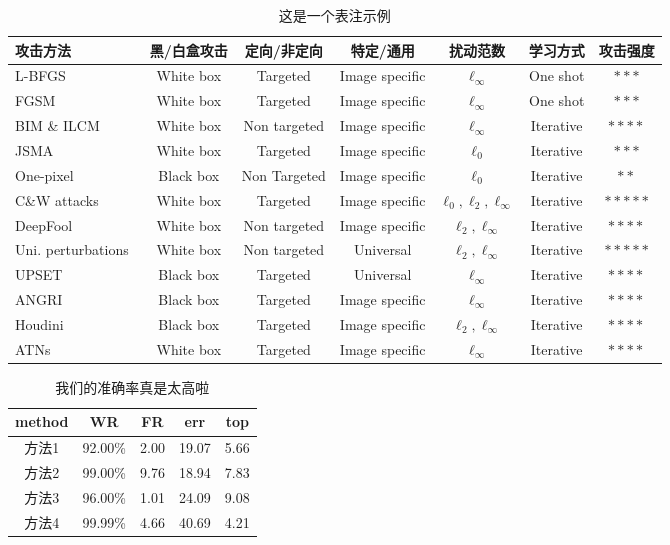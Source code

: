 \documentclass[zihao=-4]{ctexart}
\begin{document}
\begin{spacing}{1.5}
\begin{table}[t]
\centering
\caption{这是一个表注示例}
\begin{tabular}{|l||c|c|c|c|c|c|}
\hline
 {\textbf{攻击方法}}							&  黑/白盒攻击	&  定向/非定向 	& 特定/通用 	& 扰动范数 & 学习方式 		& 攻击强度  \\ \hline\hline
L-BFGS~ 		&  White box		&  Targeted					& Image specific			& $\ell_{\infty}$ 	& One shot		& $***$	\\ \hline
FGSM~		&  White box		&  Targeted					& Image specific			& $\ell_{\infty}$	& One shot		& $***$ \\ \hline
BIM \& ILCM~&  White box		& Non targeted				& Image specific			& $\ell_{\infty}$	& Iterative		& $**$$**$ 	\\ \hline
JSMA~		&  White box		& Targeted					& Image specific			& $\ell_{0}$	& Iterative			& $***$ 	\\ \hline
One-pixel~	& Black box		& Non Targeted		& Image specific		& $\ell_0$		& Iterative	& $**$ \\ \hline
C\&W attacks~ & White box	& Targeted	&	Image specific		&	$\ell_0, \ell_2, \ell_{\infty}$	&	Iterative & $*****$ \\ \hline
DeepFool~ & White box	& Non targeted		& Image specific		& $\ell_2, \ell_{\infty}$	& Iterative	& $**$$**$ \\ \hline
Uni. perturbations~ & White box	& Non targeted & Universal &	$\ell_2, \ell_{\infty}$ & Iterative & $*****$ \\ \hline
UPSET~ & Black box	& Targeted		& Universal 	&  $\ell_{\infty}$ & Iterative & $**$$**$ \\ \hline
ANGRI~ & Black box	& Targeted		& Image specific	& $\ell_{\infty}$ &	Iterative & $**$$**$ \\ \hline
Houdini~ & Black box		& Targeted		& Image specific	& $\ell_2, \ell_{\infty}$ & Iterative & $**$$**$ \\ \hline
ATNs~ & White box			& Targeted		& Image specific	& $\ell_{\infty}$ & Iterative & $**$$**$ \\ \hline
\end{tabular}
\end{table}

\begin{table}[H]
\caption{我们的准确率真是太高啦}
\centering
\begin{tabular}{ccccc}
\hline  
\textbf{method} & \textbf{WR} & \textbf{FR} & \textbf{err} & \textbf{top} \\ 
\hline  
方法1 & 92.00\% & 2.00 & 19.07  & 5.66\\
方法2 & 99.00\%   & 9.76  & 18.94 & 7.83\\
方法3 & 96.00\%   & 1.01  & 24.09  & 9.08\\
方法4 & 99.99\%   & 4.66  & 40.69 & 4.21\\
\hline
\end{tabular} 
\end{table} 


\end{spacing}
\end{document}
